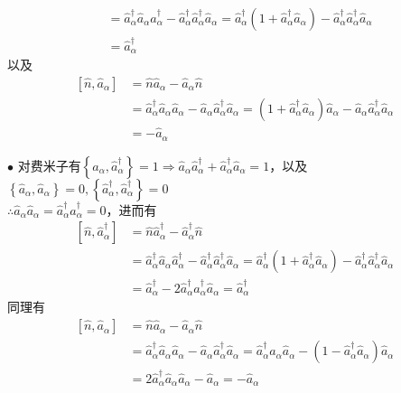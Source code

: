\documentclass[12pt]{article}
\numberwithin{equation}{section}	 %
\begin{document}
\begin{spacing}{1.5}
\begin{align*}
&= \hat{a}_{\alpha}^{\dag}\hat{a}_{\alpha}\hat{a}_{\alpha}^{\dag} - \hat{a}_{\alpha}^{\dag}\hat{a}_{\alpha}^{\dag}\hat{a}_{\alpha} = \hat{a}_{\alpha}^{\dag}\left(1+\hat{a}_{\alpha}^{\dag}\hat{a}_{\alpha}\right) - \hat{a}_{\alpha}^{\dag}\hat{a}_{\alpha}^{\dag}\hat{a}_{\alpha}\\
&= \hat{a}_{\alpha}^{\dag}
\end{align*}
以及
\begin{align*}
\left[\hat{n},\hat{a}_{\alpha}\right] &= \hat{n}\hat{a}_{\alpha} - \hat{a}_{\alpha}\hat{n} \\
&= \hat{a}_{\alpha}^{\dag}\hat{a}_{\alpha}\hat{a}_{\alpha} - \hat{a}_{\alpha}\hat{a}_{\alpha}^{\dag}\hat{a}_{\alpha} = \left(1+\hat{a}_{\alpha}^{\dag}\hat{a}_{\alpha}\right)\hat{a}_{\alpha} - \hat{a}_{\alpha}\hat{a}_{\alpha}^{\dag}\hat{a}_{\alpha}\\
&= -\hat{a}_{\alpha}
\end{align*}

$\bullet$ 对费米子有$\left\{\hat{a}_{\alpha},\hat{a}_{\alpha}^{\dag}\right\}=1 \Rightarrow \hat{a}_{\alpha}\hat{a}_{\alpha}^{\dag}+\hat{a}_{\alpha}^{\dag}\hat{a}_{\alpha}=1$，以及$\left\{\hat{a}_{\alpha},\hat{a}_{\alpha}\right\}=0,\left\{\hat{a}_{\alpha}^{\dag},\hat{a}_{\alpha}^{\dag}\right\}=0$\\
$\therefore \hat{a}_{\alpha}\hat{a}_{\alpha} = \hat{a}_{\alpha}^{\dag}\hat{a}_{\alpha}^{\dag} = 0$，进而有
\begin{align*}
\left[\hat{n},\hat{a}_{\alpha}^{\dag}\right] &= \hat{n}\hat{a}_{\alpha}^{\dag} - \hat{a}_{\alpha}^{\dag}\hat{n}\\
&= \hat{a}_{\alpha}^{\dag}\hat{a}_{\alpha}\hat{a}_{\alpha}^{\dag} - \hat{a}_{\alpha}^{\dag}\hat{a}_{\alpha}^{\dag}\hat{a}_{\alpha} = \hat{a}_{\alpha}^{\dag}\left(1+\hat{a}_{\alpha}^{\dag}\hat{a}_{\alpha}\right) - \hat{a}_{\alpha}^{\dag}\hat{a}_{\alpha}^{\dag}\hat{a}_{\alpha} \\
&= \hat{a}_{\alpha}^{\dag} - 2\hat{a}_{\alpha}^{\dag}\hat{a}_{\alpha}^{\dag}\hat{a}_{\alpha} = \hat{a}_{\alpha}^{\dag}
\end{align*}
同理有\\
\begin{align*}
\left[\hat{n},\hat{a}_{\alpha}\right] &= \hat{n}\hat{a}_{\alpha} - \hat{a}_{\alpha}\hat{n}\\
&= \hat{a}_{\alpha}^{\dag}\hat{a}_{\alpha}\hat{a}_{\alpha} - \hat{a}_{\alpha}\hat{a}_{\alpha}^{\dag}\hat{a}_{\alpha} = \hat{a}_{\alpha}^{\dag}\hat{a}_{\alpha}\hat{a}_{\alpha} - \left(1-\hat{a}_{\alpha}^{\dag}\hat{a}_{\alpha}\right)\hat{a}_{\alpha}  \\
&= 2\hat{a}_{\alpha}^{\dag}\hat{a}_{\alpha}\hat{a}_{\alpha} - \hat{a}_{\alpha} = -\hat{a}_{\alpha}
\end{align*}
~\\
~\\



\end{spacing}
\end{document}
